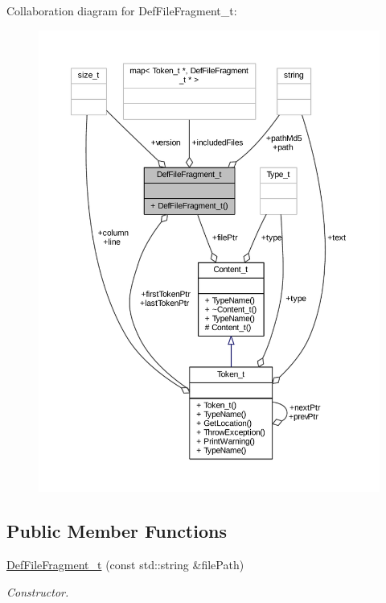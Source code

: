 Collaboration diagram for Def\+File\+Fragment\+\_\+t\+:
\nopagebreak
\begin{figure}[H]
\begin{center}
\leavevmode
\includegraphics[width=350pt]{struct_def_file_fragment__t__coll__graph}
\end{center}
\end{figure}
\subsection*{Public Member Functions}
\begin{DoxyCompactItemize}
\item 
\hyperlink{struct_def_file_fragment__t_a8dfbda00361e56e2cc8fcecd3c849869}{Def\+File\+Fragment\+\_\+t} (const std\+::string \&file\+Path)
\begin{DoxyCompactList}\small\item\em Constructor. \end{DoxyCompactList}\end{DoxyCompactItemize}
